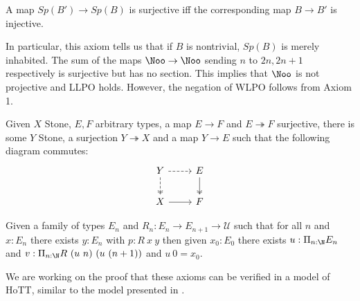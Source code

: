 \begin{axiom}
  A map $Sp(B')\to Sp(B)$ is surjective iff the corresponding map $B \to B'$ is injective.
\end{axiom} 
In particular, this axiom tells us that if $B$ is nontrivial, 
$Sp(B)$ is merely inhabited.
%
%
The sum of the maps
$\Noo \to \Noo$
sending $n$ to $2n,2n+1$ respectively
is surjective but has no section. 
This implies that $\Noo$ is not projective and LLPO holds. 
However, the negation of WLPO follows from Axiom 1.  

\begin{axiomNum}
  Given $X$ Stone, $E,F$ arbitrary types, a map $E \to F$ and $E\twoheadrightarrow F$ surjective, 
  there is some $Y$ Stone,
    a surjection $Y \twoheadrightarrow X$ and a map $Y\to E$ such that the following diagram commutes:
    \begin{equation*}\begin{tikzcd}
      Y \arrow [d, two heads,dashed] \arrow [r,dashed] & E \arrow[d,""',two heads]\\
      X \arrow[r] & F
    \end{tikzcd}\end{equation*}  
\end{axiomNum} 

\begin{axiomNum}
  Given a family of types $E_n$ and $R_n:E_n\rightarrow E_{n+1}\rightarrow {\mathcal U}$ such that
  for all $n$ and $x:E_n$ there exists $y:E_n$ with $p:R~x~y$ then given $x_0:E_0$ there exists
  $u:\Pi_{n:\N}E_n$ and $v:\Pi_{n:\N}R~(u~n)~(u~(n+1))$ and $u~0 = x_0$.
\end{axiomNum}

We are working on the proof that these axioms can be verified in a model of HoTT, similar
to the model presented in \cite{draft}.
